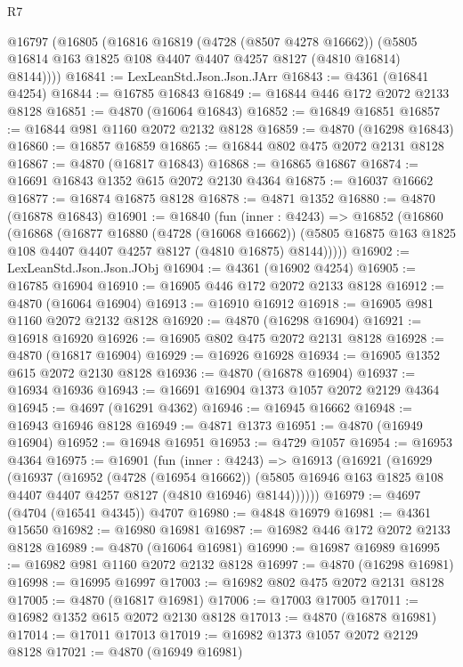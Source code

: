 \begin{lexlean}{R7}
\begin{coremodule}
    @16797
      (@16805
        (@16816
          @16819
          (@4728 (@8507 @4278 @16662))
          (@5805 @16814 @163 @1825 @108 @4407 @4407 @4257 @8127 (@4810 @16814) @8144))))
@16841 := LexLeanStd.Json.Json.JArr
@16843 := @4361 (@16841 @4254)
@16844 := @16785 @16843
@16849 := @16844 @446 @172 @2072 @2133 @8128
@16851 := @4870 (@16064 @16843)
@16852 := @16849 @16851
@16857 := @16844 @981 @1160 @2072 @2132 @8128
@16859 := @4870 (@16298 @16843)
@16860 := @16857 @16859
@16865 := @16844 @802 @475 @2072 @2131 @8128
@16867 := @4870 (@16817 @16843)
@16868 := @16865 @16867
@16874 := @16691 @16843 @1352 @615 @2072 @2130 @4364
@16875 := @16037 @16662
@16877 := @16874 @16875 @8128
@16878 := @4871 @1352
@16880 := @4870 (@16878 @16843)
@16901 := @16840
    (fun (inner : @4243) =>
    @16852
      (@16860
        (@16868
          (@16877
            @16880
            (@4728 (@16068 @16662))
            (@5805 @16875 @163 @1825 @108 @4407 @4407 @4257 @8127 (@4810 @16875) @8144)))))
@16902 := LexLeanStd.Json.Json.JObj
@16904 := @4361 (@16902 @4254)
@16905 := @16785 @16904
@16910 := @16905 @446 @172 @2072 @2133 @8128
@16912 := @4870 (@16064 @16904)
@16913 := @16910 @16912
@16918 := @16905 @981 @1160 @2072 @2132 @8128
@16920 := @4870 (@16298 @16904)
@16921 := @16918 @16920
@16926 := @16905 @802 @475 @2072 @2131 @8128
@16928 := @4870 (@16817 @16904)
@16929 := @16926 @16928
@16934 := @16905 @1352 @615 @2072 @2130 @8128
@16936 := @4870 (@16878 @16904)
@16937 := @16934 @16936
@16943 := @16691 @16904 @1373 @1057 @2072 @2129 @4364
@16945 := @4697 (@16291 @4362)
@16946 := @16945 @16662
@16948 := @16943 @16946 @8128
@16949 := @4871 @1373
@16951 := @4870 (@16949 @16904)
@16952 := @16948 @16951
@16953 := @4729 @1057
@16954 := @16953 @4364
@16975 := @16901
    (fun (inner : @4243) =>
    @16913
      (@16921
        (@16929
          (@16937
            (@16952
              (@4728 (@16954 @16662))
              (@5805 @16946 @163 @1825 @108 @4407 @4407 @4257 @8127 (@4810 @16946) @8144))))))
@16979 := @4697 (@4704 (@16541 @4345)) @4707
@16980 := @4848 @16979
@16981 := @4361 @15650
@16982 := @16980 @16981
@16987 := @16982 @446 @172 @2072 @2133 @8128
@16989 := @4870 (@16064 @16981)
@16990 := @16987 @16989
@16995 := @16982 @981 @1160 @2072 @2132 @8128
@16997 := @4870 (@16298 @16981)
@16998 := @16995 @16997
@17003 := @16982 @802 @475 @2072 @2131 @8128
@17005 := @4870 (@16817 @16981)
@17006 := @17003 @17005
@17011 := @16982 @1352 @615 @2072 @2130 @8128
@17013 := @4870 (@16878 @16981)
@17014 := @17011 @17013
@17019 := @16982 @1373 @1057 @2072 @2129 @8128
@17021 := @4870 (@16949 @16981)

\end{coremodule}
\end{lexlean}
